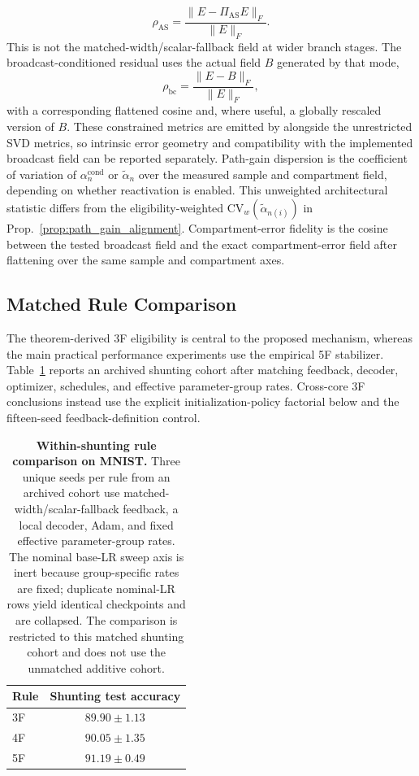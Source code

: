     \[
    \rho_{\mathrm{AS}}=
    \frac{\|E-\Pi_{\mathrm{AS}}E\|_F}{\|E\|_F}.
    \]
    This is not the matched-width/scalar-fallback field at wider branch stages. The broadcast-conditioned residual uses the actual field $B$ generated by that mode,
    \[
    \rho_{\mathrm{bc}}=\frac{\|E-B\|_F}{\|E\|_F},
    \]
    with a corresponding flattened cosine and, where useful, a globally rescaled version of $B$. These constrained metrics are emitted by  alongside the unrestricted SVD metrics, so intrinsic error geometry and compatibility with the implemented broadcast field can be reported separately. Path-gain dispersion is the coefficient of variation of $\alpha_n^{\mathrm{cond}}$ or $\tilde{\alpha}_n$ over the measured sample and compartment field, depending on whether reactivation is enabled. This unweighted architectural statistic differs from the eligibility-weighted $\mathrm{CV}_w(\tilde{\alpha}_{n(i)})$ in Prop.~\ref{prop:path_gain_alignment}. Compartment-error fidelity is the cosine between the tested broadcast field and the exact compartment-error field after flattening over the same sample and compartment axes.
    
    \subsection{Matched Rule Comparison}
    The theorem-derived 3F eligibility is central to the proposed mechanism, whereas the main practical performance experiments use the empirical 5F stabilizer. Table~\ref{tab:matched_rule_comparison} reports an archived shunting cohort after matching feedback, decoder, optimizer, schedules, and effective parameter-group rates. Cross-core 3F conclusions instead use the explicit initialization-policy factorial below and the fifteen-seed feedback-definition control.

    \begin{table}[htbp]
    \centering
    \small
    \begin{tabular}{@{}lc@{}}
    \toprule
    \textbf{Rule} & \textbf{Shunting test accuracy} \\
    \midrule
    3F & $89.90\pm1.13$ \\
    4F & $90.05\pm1.35$ \\
    5F & $91.19\pm0.49$ \\
    \bottomrule
    \end{tabular}
    \caption{\textbf{Within-shunting rule comparison on MNIST.} Three unique seeds per rule from an archived cohort use matched-width/scalar-fallback feedback, a local decoder, Adam, and fixed effective parameter-group rates. The nominal base-LR sweep axis is inert because group-specific rates are fixed; duplicate nominal-LR rows yield identical checkpoints and are collapsed. The comparison is restricted to this matched shunting cohort and does not use the unmatched additive cohort.}
    \label{tab:matched_rule_comparison}
    \end{table}

